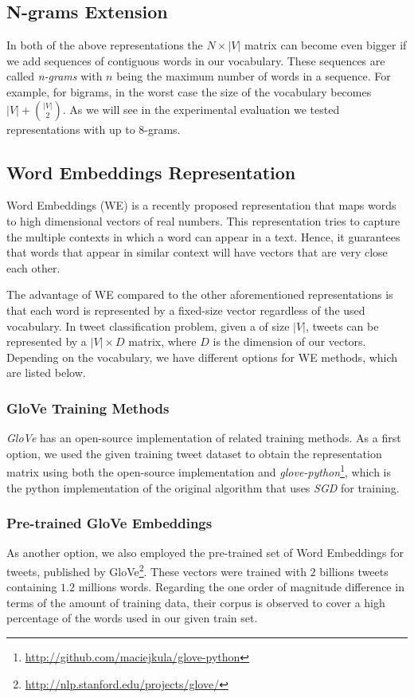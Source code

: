 \subsection{N-grams Extension}
In both of the above representations the $N \times |V|$ matrix
can become even bigger if we add sequences of contiguous words in our vocabulary.
These sequences are called \textit{n-grams} with $n$ being the maximum number of words in a sequence.  
For example, for bigrams, in the worst case the size of the vocabulary becomes $|V| + {|V| \choose 2}$.
As we will see in the experimental evaluation we tested representations with up to 8-grams. 


\subsection{Word Embeddings Representation}
Word Embeddings (WE) \cite{DBLP:journals/corr/MikolovSCCD13} is a recently proposed representation that maps words to high dimensional vectors of real numbers. 
This representation tries to capture the multiple contexts in which a word can appear in a text.
Hence, it guarantees that words that appear in similar context will have vectors that are very close each other.

The advantage of WE compared to the other aforementioned  representations is that each word is represented by a fixed-size vector regardless of the used vocabulary.
In tweet classification problem, given a of size $|V|$, tweets can be represented by a $|V| \times D$ matrix, where $D$ is the dimension of our vectors.
Depending on the vocabulary, we have different options for WE methods, which are listed below.

\subsubsection{GloVe Training Methods}
\textit{GloVe} \cite{pennington2014glove} has an open-source implementation of related training methods.
As a first option, we used the given training tweet dataset to obtain the representation matrix using both the open-source implementation and \textit{glove-python}\footnote{\url{http://github.com/maciejkula/glove-python}}, which is the python implementation of the original algorithm that uses \textit{SGD} for training.

\subsubsection{Pre-trained GloVe Embeddings}
As another option, we also employed the pre-trained set of Word Embeddings for tweets, published by GloVe\footnote{\url{http://nlp.stanford.edu/projects/glove/}}.
These vectors were trained with $2$ billions tweets containing $1.2$ millions words.
Regarding the one order of magnitude difference in terms of the amount of training data, their corpus is observed to cover a high percentage of the words used in our given train set.

